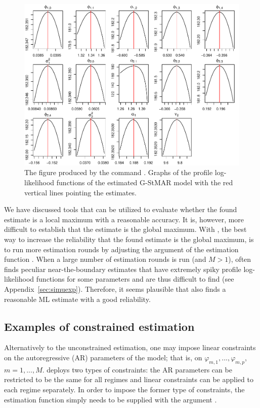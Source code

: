 \documentclass[nojss]{jss} %
\begin{document}
\begin{figure}[t]
  \centering
  \includegraphics{figures/proflogfit42gs.pdf}
  \caption{The figure produced by the command . Graphs of the profile log-likelihood functions of the estimated G-StMAR model  with the red vertical lines pointing the estimates.}
\label{fig:proflogfit42gs}
\end{figure}

We have discussed tools that can be utilized to evaluate whether the found estimate is a local maximum with a reasonable accuracy. It is, however, more difficult to establish that the estimate is the global maximum. With , the best way to increase the reliability that the found estimate is the global maximum, is to run more estimation rounds by adjusting the argument  of the estimation function . When a large number of estimation rounds is run (and $M>1$),  often finds peculiar near-the-boundary estimates that have extremely spiky profile log-likelihood functions for some parameters and are thus difficult to find (see Appendix~\ref{sec:simuexp}). Therefore, it seems plausible that  also finds a reasonable ML estimate with a good reliability.

\subsection{Examples of constrained estimation}\label{sec:examp_const}

Alternatively to the unconstrained estimation, one may impose linear constraints on the autoregressive (AR) parameters of the model; that is, on $\varphi_{m,1},...,\varphi_{m,p}$, $m=1,...,M$.  deploys two types of constraints: the AR parameters can be restricted to be the same for all regimes and linear constraints can be applied to each regime separately. In order to impose the former type of constraints, the estimation function simply needs to be supplied with the argument .
\end{document}
